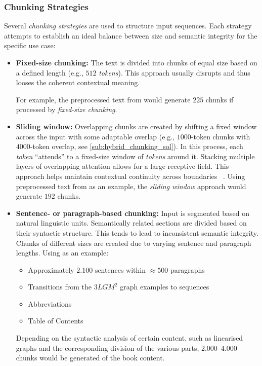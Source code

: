 \subsubsection{Chunking Strategies}\label{subsub:chunking_strat}
%
Several \textit{chunking strategies} are used to structure input sequences.
Each strategy attempts to establish an ideal balance between size and semantic integrity for the specific use case:
%
\begin{itemize}
    \item \textbf{Fixed-size chunking:}
    The text is divided into chunks of equal size based on a defined length (e.g., $512$ \textit{tokens}).
    This approach usually disrupts and thus looses the coherent contextual meaning.
    
    For example, the preprocessed text from \citet{bb2} would generate $225$ chunks if processed by \textit{fixed-size chunking}. 
    \item \textbf{Sliding window:} 
    Overlapping chunks are created by shifting a fixed window across the input with some adaptable overlap (e.g., $1000$-token chunks with $4000$-token overlap, see \cref{sub:hybrid_chunking_sol}).
    In this process, each \textit{token} \enquote{attends} to a fixed-size window of \textit{tokens} around it.
    Stacking multiple layers of overlapping attention allows for a large receptive field.
    This approach helps maintain contextual continuity across boundaries ~\citep{beltagy2020longformerlongdocumenttransformer}.
    Using preprocessed text from \citet{bb2} as an example, the \textit{sliding window} approach would generate $192$ chunks.
    \item \textbf{Sentence- or paragraph-based chunking:} Input is segmented based on natural linguistic units.
    Semantically related sections are divided based on their syntactic structure.
    This tends to lead to inconsistent semantic integrity. 
    Chunks of different sizes are created due to varying sentence and paragraph lengths.
    Using \citet{bb2} as an example:
    \begin{itemize}
        \item Approximately $2.100$ sentences within $\approx500$ paragraphs
        \item Transitions from the $3LGM^2$ graph examples to sequences
        \item Abbreviations
        \item Table of Contents
    \end{itemize}
    Depending on the syntactic analysis of certain content, such as linearised graphs and the corresponding division of the various parts, \numrange{2,000}{4,000} chunks would be generated of the book content.

\end{itemize}
